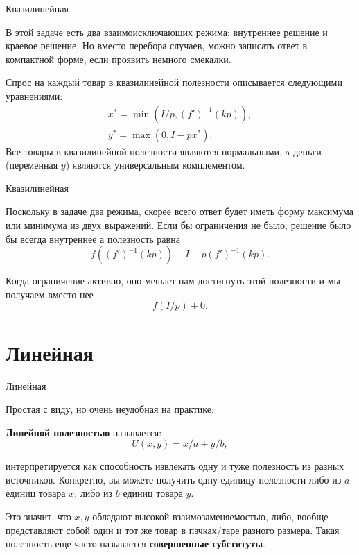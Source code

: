 \documentclass{beamer}
\begin{document}
\begin{frame}{Квазилинейная}

В этой задаче есть два взаимоисключающих режима: внутреннее решение и краевое решение. Но вместо перебора случаев, можно записать ответ в компактной форме, если проявить немного смекалки.

Спрос на каждый товар в квазилинейной полезности описывается следующими уравнениями:
\begin{gather*}
x^{\ast} = \min (I/p, (f')^{-1}(k p)), \\
y^{\ast} = \max (0, I-px^{\ast}).
\end{gather*}
Все товары в квазилинейной полезности являются нормальными, a деньги (переменная $y$) являются универсальным комплементом.
\end{frame}

\begin{frame}{Квазилинейная}

Поскольку в задаче два режима, скорее всего ответ будет иметь форму максимума или минимума из двух выражений. Если бы ограничения не было, решение было бы всегда внутреннее а полезность равна 
$$f((f')^{-1}(k p)) + I - p (f')^{-1}(k p).$$

Когда ограничение активно, оно мешает нам достигнуть этой полезности и мы получаем вместо нее
$$ f(I/p) + 0.$$

\end{frame}

\section{Линейная}

\begin{frame}{Линейная}

Простая с виду, но очень неудобная на практике:

\begin{definition}
\textbf{Линейной полезностью} называется:
$$U(x, y) = x/a +y/b,$$ 
\end{definition}

интерпретируется как способность извлекать одну и туже полезность из разных источников.  Конкретно, вы можете получить одну единицу полезности либо из $a$ единиц товара $x$, либо из $b$ единиц товара $y$. 

Это значит, что $x, y$ обладают высокой взаимозаменяемостью, либо, вообще представляют собой один и тот же товар в пачках/таре разного размера. Такая полезность еще часто называется \textbf{совершенные субституты}.

\end{frame}
\end{document}
